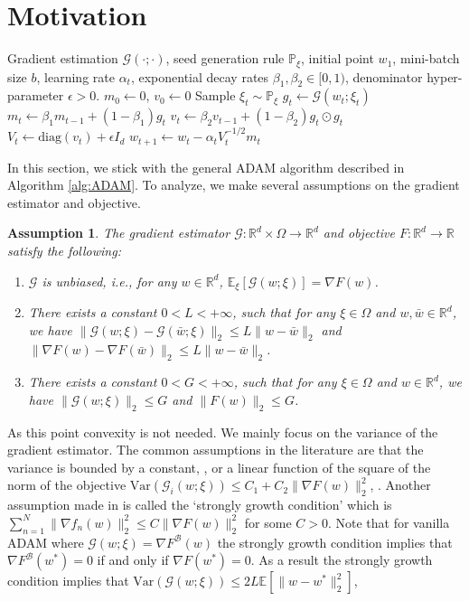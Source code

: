 \documentclass[twoside]{article}
\def\RR{\mathbb{R}}
\def\EE{\mathbb{E}}
\def\PP{\mathbb{P}}
\def\BB{\mathcal{B}}
\def\GG{\mathcal{G}}
\newtheorem{assumption}{Assumption}
\begin{document}
\section{Motivation}
\label{sec:motivate}
\begin{algorithm}
\caption{General ADAM}\label{alg:ADAM}
\begin{algorithmic}
\Require Gradient estimation $\GG(\cdot;\cdot)$, seed generation rule $\PP_\xi$, initial point $w_1$, mini-batch size $b$, learning rate $\alpha_t$, exponential decay rates $\beta_1, \beta_2\in[0,1)$, denominator hyper-parameter $\epsilon>0$.
\State $m_0\gets 0$, $v_0\gets 0$
\State Sample $\xi_t\sim\PP_\xi$
\State $g_t \gets \GG(w_t;\xi_t)$
\State $m_t \gets \beta_1 m_{t-1} + (1-\beta_1) g_t$
\State $v_t \gets \beta_2 v_{t-1} + (1-\beta_2) g_t \odot g_t$
\State $V_t \gets \mathrm{diag}(v_t) + \epsilon I_d$
\State $w_{t+1} \gets w_t - \alpha_t V_t^{-1/2} m_t$
\EndFor
\end{algorithmic}
\end{algorithm}
In this section, we stick with the general ADAM algorithm described in Algorithm \ref{alg:ADAM}. To analyze, we make several assumptions on the gradient estimator and objective.
\begin{assumption}
\label{assmpt:Basic}
The gradient estimator $\GG:\RR^d\times \Omega\to\RR^d$ and objective $F:\RR^d \to \RR$ satisfy the following:
\begin{enumerate}
    \item $\GG$ is unbiased, i.e., for any $w\in \RR^d$, $\EE_\xi\left[\GG(w;\xi)\right] = \nabla F(w)$.
    \item There exists a constant $0<L<+\infty$, such that for any $\xi\in \Omega$ and $w,\bar{w}\in \RR^d$, we have $\| \GG( w;\xi) - \GG(\bar w;\xi)\|_2\leq L \|w-\bar w\|_2$ and $\|\nabla F(w)- \nabla F(\bar w)\|_2\leq L\|w-\bar w\|_2$.
    \item There exists a constant $0<G<+\infty$, such that for any $\xi\in\Omega$ and $w\in\RR^d$, we have $\|\GG(w;\xi)\|_2\leq G$ and $\|F(w)\|_2\leq G$.
\end{enumerate}

\end{assumption}
As this point convexity is not needed. We mainly focus on the variance of the gradient estimator. The common assumptions in the literature are that the variance is bounded by a constant, \cite{zaheer2018adaptive}, or a linear function of the square of the norm of the objective  $\mathrm{Var}(\GG_i(w;\xi)) \leq C_1 + C_2 \|\nabla F(w)\|_2^2$, \cite{bottou2018optimization}. Another assumption made in \cite{shi2020rmsprop, vaswani2019fast} is called the `strongly growth condition' which is $\sum_{n=1}^N \|\nabla f_n(w)\|_2^2\leq C \|\nabla F(w)\|_2^2$ for some $C>0$. Note that for vanilla ADAM where $\GG(w;\xi)=\nabla F^{\BB}(w)$ the strongly growth condition implies that $\nabla F^{\BB}(w^*) = 0$ if and only if $\nabla F(w^*)=0$. As a result the strongly growth condition implies that $\mathrm{Var}(\GG(w;\xi))\leq 2L \EE[\|w-w^*\|_2^2]$,
\end{document}
